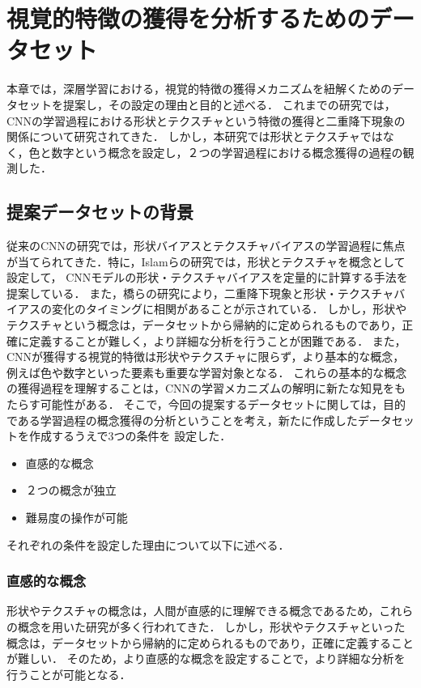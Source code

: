 \chapter{視覚的特徴の獲得を分析するためのデータセット}
\label{chap:experiment_settings}
本章では，深層学習における，視覚的特徴の獲得メカニズムを紐解くためのデータセットを提案し，その設定の理由と目的と述べる．
これまでの研究では，CNNの学習過程における形状とテクスチャという特徴の獲得と二重降下現象の関係について研究されてきた．
しかし，本研究では形状とテクスチャではなく，色と数字という概念を設定し，２つの学習過程における概念獲得の過程の観測した．

\section{提案データセットの背景}
従来のCNNの研究では，形状バイアスとテクスチャバイアスの学習過程に焦点が当てられてきた．特に，Islamらの研究では，形状とテクスチャを概念として設定して，
CNNモデルの形状・テクスチャバイアスを定量的に計算する手法を提案している．
また，橋らの研究により，二重降下現象と形状・テクスチャバイアスの変化のタイミングに相関があることが示されている．
しかし，形状やテクスチャという概念は，データセットから帰納的に定められるものであり，正確に定義することが難しく，より詳細な分析を行うことが困難である．
また，CNNが獲得する視覚的特徴は形状やテクスチャに限らず，より基本的な概念，例えば色や数字といった要素も重要な学習対象となる．
これらの基本的な概念の獲得過程を理解することは，CNNの学習メカニズムの解明に新たな知見をもたらす可能性がある．
そこで，今回の提案するデータセットに関しては，目的である学習過程の概念獲得の分析ということを考え，新たに作成したデータセットを作成するうえで3つの条件を
設定した．

\begin{itemize}
    \item 直感的な概念
    \item ２つの概念が独立
    \item 難易度の操作が可能
\end{itemize}

それぞれの条件を設定した理由について以下に述べる．

\newpage

\subsection{直感的な概念}
形状やテクスチャの概念は，人間が直感的に理解できる概念であるため，これらの概念を用いた研究が多く行われてきた．
しかし，形状やテクスチャといった概念は，データセットから帰納的に定められるものであり，正確に定義することが難しい．
そのため，より直感的な概念を設定することで，より詳細な分析を行うことが可能となる．

